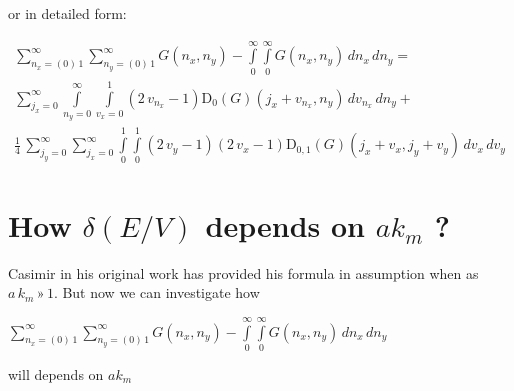 \documentclass[11pt]{article}
\begin{document}
    or in detailed form:

\begin{equation}
\begin{array}{l}
\sum\limits_{n_x=\left(0\right)\,1}^{\infty}
\sum\limits_{n_y=\left(0\right)\,1}^{\infty}
G\left(n_x, n_y\right)
-
\int\limits_{0}^{\infty}
\int\limits_{0}^{\infty}
G\left(n_x, n_y\right)\,d{n_x}\,d{n_y} = \\
{\sum\limits_{j_{x}=0}^{\infty} \int\limits_{n_{y}=0}^{\infty} \int\limits_{v_x=0}^{1}  {\left(2 \, v_{n_{x}} - 1\right)} \mathrm{D}_{0}\left(G\right)\left(j_{x} + v_{n_{x}}, n_{y}\right)\,{d v_{n_{x}}}\,{d n_{y}}} + \\
\frac{1}{4} \, {\sum\limits_{j_{y}=0}^{\infty} {\sum\limits_{j_{x}=0}^{\infty} \int\limits_{0}^{1} \int\limits_{0}^{1} {\left(2 \, v_{y} - 1\right)} {\left(2 \, v_{x} - 1\right)} \mathrm{D}_{0, 1}\left(G\right)\left(j_{x} + v_{x}, j_{y} + v_{y}\right)\,{d v_{x}}}\,{d v_{y}}}
\end{array}
\end{equation}

    \section{\texorpdfstring{How \(\delta\left(E/V\right)\) depends on
\(a k_m\)
?}{How \textbackslash{}delta\textbackslash{}left(E/V\textbackslash{}right) depends on a k\_m ?}}\label{how-deltaleftevright-depends-on-a-k_m}

    Casimir in his original work has provided his formula in assumption when
as \(a\,k_m\,»\,1\). But now we can investigate how

\(\sum\limits_{n_x=\left(0\right)\,1}^{\infty} \sum\limits_{n_y=\left(0\right)\,1}^{\infty} G\left(n_x, n_y\right) - \int\limits_{0}^{\infty} \int\limits_{0}^{\infty} G\left(n_x, n_y\right)\,d{n_x}\,d{n_y}\)

will depends on \(a k_m\)
\end{document}
